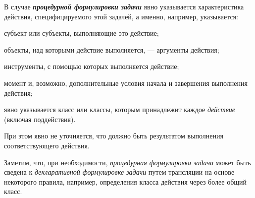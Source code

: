 В случае \textbf{\textit{процедурной формулировки задачи}} явно указывается характеристика действия, специфицируемого этой задачей, а именно, например, указывается:
\begin{textitemize}
	\item субъект или субъекты, выполняющие это действие;
	\item объекты, над которыми действие выполняется, --- аргументы действия;
	\item инструменты, с помощью которых выполняется действие;
	\item момент и, возможно, дополнительные условия начала и завершения выполнения действия;
	\item явно указывается класс или классы, которым принадлежит каждое \textit{действие} (включая поддействия).
\end{textitemize}

При этом явно не уточняется, что должно быть результатом выполнения соответствующего действия.

Заметим, что, при необходимости, \textit{процедурная формулировка задачи} может быть сведена к \textit{декларативной формулировке задачи} путем трансляции на основе некоторого правила, например, определения класса действия через более общий класс.

